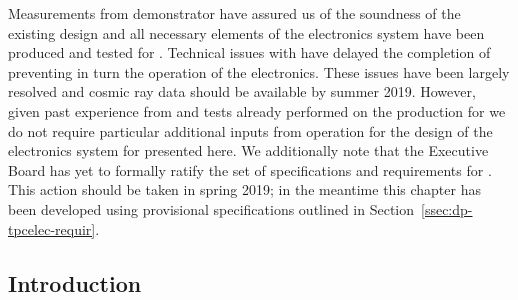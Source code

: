 Measurements from  demonstrator have assured us of the soundness of the existing design and all necessary elements of the  electronics system have been produced and tested for . Technical issues with  have delayed the completion of  preventing in turn the operation of the electronics. These issues have been largely resolved and cosmic ray data should be available by summer 2019. However, given past experience from  and tests already performed on the production for  we do not require particular additional inputs from  operation for the design of the electronics system for  presented here. We additionally note that the  Executive Board has yet to formally ratify the set of specifications and requirements for . This action should be taken in spring 2019; in the meantime this chapter has been developed using provisional specifications outlined in Section~\ref{ssec:dp-tpcelec-requir}.

\begin{comment}  Anne's not sure this is needed.
This chapter is organized as follows. In this section we provide an overview of the \dword{dp} \dword{tpc} electronics system and discuss design considerations. In Section~\ref{sec:dp-tpcelec-design}, we give detailed descriptions of the principal components. This is followed by the discussion of the production scheme, quality assurance and control, and calibration program in Section~\ref{sec:dp-tpcelec-production}. Section~\ref{sec:dp-tpcelec-transport} briefly covers the transportation and handling, while Section~\ref{sec:dp-tpcelec-intfc} describes interfaces to other detector systems. Details on the installation, integration, and commissioning of the \dword{dp} \dword{tpc} electronics system underground are provided in Section~\ref{sec:dp-tpcelec-install}. Sections~\ref{sec:dp-tpcelec-risks} and~\ref{sec:dp-tpcelec-safety} address risks and safety, respectively. Section~\ref{sec:dp-tpcelec-org} presents the organizational structure of the \dword{dp} \dword{tpc} electronics consortium, discusses schedule, and provides the estimates of the core costs. 
\end{comment}

\subsection{Introduction}
\label{ssec:dp-tpcelec-intro}

